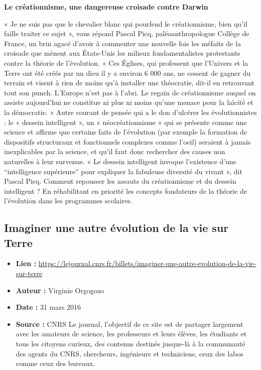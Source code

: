 \documentclass[8pt]{article}
\begin{document}
\textbf{Le créationnisme, une dangereuse croisade contre Darwin}


« Je ne suis pas que le chevalier blanc qui pourfend le créationnisme, bien qu’il faille traiter ce sujet », vous répond Pascal Picq, paléoanthropologue Collège de France, un brin agacé d’avoir à commenter une nouvelle fois les méfaits de la croisade que mènent aux États-Unis les milieux fondamentalistes protestants contre la théorie de l’évolution. « Ces Églises, qui professent que l’Univers et la Terre ont été créés par un dieu il y a environ 6 000 ans, ne cessent de gagner du terrain et visent à rien de moins qu’à installer une théocratie, dit-il en retrouvant tout son punch. L’Europe n’est pas à l’abri. Le regain de créationnisme auquel on assiste aujourd’hui ne constitue ni plus ni moins qu’une menace pour la laïcité et la démocratie. » Autre courant de pensée qui a le don d’ulcérer les évolutionnistes : le « dessein intelligent », un « néocréationnisme » qui se présente comme une science et affirme que certains faits de l’évolution (par exemple la formation de dispositifs structuraux et fonctionnels complexes comme l’oeil) seraient à jamais inexplicables par la science, et qu’il faut donc rechercher des causes non naturelles à leur survenue. « Le dessein intelligent invoque l’existence d’une “intelligence supérieure” pour expliquer la fabuleuse diversité du vivant », dit Pascal Picq. Comment repousser les assauts du créationnisme et du dessein intelligent ? En réhabilitant en priorité les concepts fondateurs de la théorie de l’évolution dans les programmes scolaires.\\

\newpage
\subsection{Imaginer une autre évolution de la vie sur Terre}

\begin{itemize}
	\item \textbf{Lien : }  \url{https://lejournal.cnrs.fr/billets/imaginer-une-autre-evolution-de-la-vie-sur-terre} 
	\item \textbf{Auteur : }  Virginie Orgogozo
	\item \textbf{Date : }  31 mars 2016
	\item \textbf{Source : } CNRS Le journal, l'objectif de ce site est de partager largement avec les amateurs de science, les professeurs et leurs élèves, les étudiants et tous les citoyens curieux, des contenus destinés jusque-là à la communauté des agents du CNRS, chercheurs, ingénieurs et techniciens, ceux des labos comme ceux des bureaux.
\end{itemize}
\end{document}
